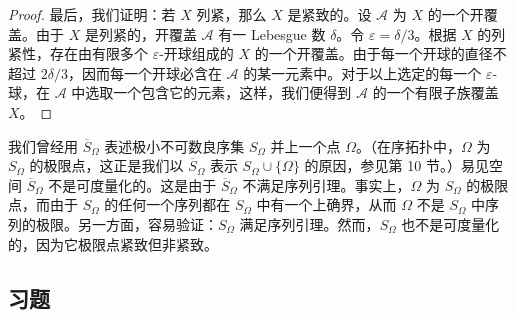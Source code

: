 \begin{proof}
最后，我们证明：若 $X$ 列紧，那么 $X$ 是紧致的。设 $\mathcal{A}$ 为 $X$ 的一个开覆盖。由于 $X$ 是列紧的，开覆盖 $\mathcal{A}$ 有一 Lebesgue 数 $\delta$。令 $\varepsilon=\delta/3$。根据 $X$ 的列紧性，存在由有限多个 $\varepsilon$-开球组成的 $X$ 的一个开覆盖。由于每一个开球的直径不超过 $2\delta/3$，因而每一个开球必含在 $\mathcal{A}$ 的某一元素中。对于以上选定的每一个 $\varepsilon$-球，在 $\mathcal{A}$ 中选取一个包含它的元素，这样，我们便得到 $\mathcal{A}$ 的一个有限子族覆盖 $X$。
\end{proof}

\begin{example}\label{example:ch03-sbar-omega-not-metrizable}
我们曾经用 $\overline{S}_{\Omega}$ 表述极小不可数良序集 $S_{\Omega}$ 并上一个点 $\Omega$。（在序拓扑中，$\Omega$ 为 $S_{\Omega}$ 的极限点，这正是我们以 $\overline{S}_{\Omega}$ 表示 $S_{\Omega}\cup\{\Omega\}$ 的原因，参见第 10 节。）易见空间 $\overline{S}_{\Omega}$ 不是可度量化的。这是由于 $\overline{S}_{\Omega}$ 不满足序列引理。事实上，$\Omega$ 为 $S_{\Omega}$ 的极限点，而由于 $S_{\Omega}$ 的任何一个序列都在 $S_{\Omega}$ 中有一个上确界，从而 $\Omega$ 不是 $S_{\Omega}$ 中序列的极限。另一方面，容易验证：$S_{\Omega}$ 满足序列引理。然而，$S_{\Omega}$ 也不是可度量化的，因为它极限点紧致但非紧致。
\end{example}

\subsection*{习题}

